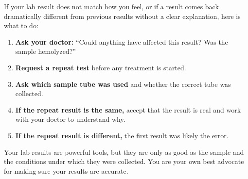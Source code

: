If your lab result does not match how you feel, or if a result comes back dramatically different from previous results without a clear explanation, here is what to do:

\begin{enumerate}
    \item \textbf{Ask your doctor:} ``Could anything have affected this result? Was the sample hemolyzed?''
    \item \textbf{Request a repeat test} before any treatment is started.
    \item \textbf{Ask which sample tube was used} and whether the correct tube was collected.
    \item \textbf{If the repeat result is the same,} accept that the result is real and work with your doctor to understand why.
    \item \textbf{If the repeat result is different,} the first result was likely the error.
\end{enumerate}

Your lab results are powerful tools, but they are only as good as the sample and the conditions under which they were collected. You are your own best advocate for making sure your results are accurate.
